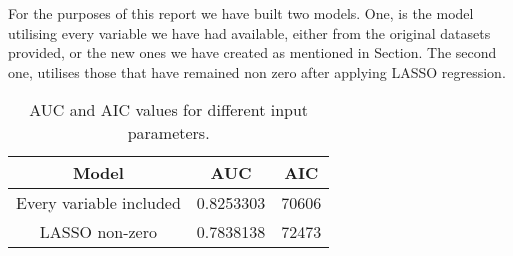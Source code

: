 For the purposes of this report we have built two models. One, is the model utilising every variable we have had available, either from the original datasets provided, or the new ones we have created as mentioned in Section. The second one, utilises those that have remained non zero after applying LASSO regression.
    
    
    
    
    
    
    
    
    
    
    
    
    
    
    
    
    
    
    \begin{table}[H]
        \centering
            \begin{tabular}{c|c|c}
            Model & AUC & AIC \\\hline
            Every variable included & 0.8253303 & 70606\\
            LASSO non-zero &  0.7838138 & 72473\\
            
		    \end{tabular}
            \caption{AUC and AIC values for different input parameters.}
	        \label{ModelAICandAUC}
    \end{table}
